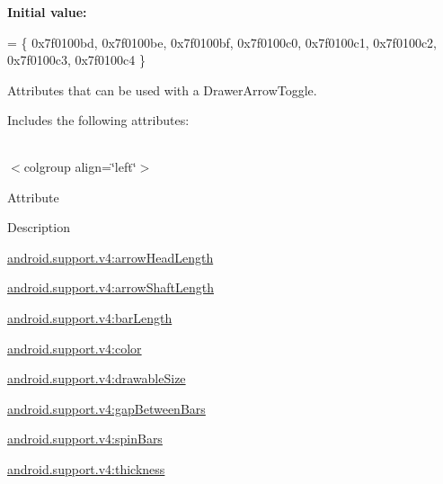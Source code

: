 {\bfseries Initial value\+:}
\begin{DoxyCode}
= \{
            0x7f0100bd, 0x7f0100be, 0x7f0100bf, 0x7f0100c0,
            0x7f0100c1, 0x7f0100c2, 0x7f0100c3, 0x7f0100c4
        \}
\end{DoxyCode}
Attributes that can be used with a Drawer\+Arrow\+Toggle. 

Includes the following attributes\+:

\tabulinesep=1mm
\begin{longtabu} spread 0pt [c]{*{0}{|X[-1]}|}
\hline
\end{longtabu}
$<$colgroup align=\char`\"{}left\char`\"{}$>$ 

Attribute

Description 

{\ttfamily \hyperlink{classandroid_1_1support_1_1v4_1_1R_1_1styleable_a23a9c7acda0be283d52e3f0e07fb0a97}{android.\+support.\+v4\+:arrow\+Head\+Length}}

{\ttfamily \hyperlink{classandroid_1_1support_1_1v4_1_1R_1_1styleable_ab53d0e29cd65acb145c6d9782b331b94}{android.\+support.\+v4\+:arrow\+Shaft\+Length}}

{\ttfamily \hyperlink{classandroid_1_1support_1_1v4_1_1R_1_1styleable_a4f8d98b05b91ea2e7981c8af25395159}{android.\+support.\+v4\+:bar\+Length}}

{\ttfamily \hyperlink{classandroid_1_1support_1_1v4_1_1R_1_1styleable_ace7c2b30ab349131726e0b7a4ea67103}{android.\+support.\+v4\+:color}}

{\ttfamily \hyperlink{classandroid_1_1support_1_1v4_1_1R_1_1styleable_a4c53abe96194151c3a62076cc72f6048}{android.\+support.\+v4\+:drawable\+Size}}

{\ttfamily \hyperlink{classandroid_1_1support_1_1v4_1_1R_1_1styleable_ae17bd4d67410b191b674e1359e019598}{android.\+support.\+v4\+:gap\+Between\+Bars}}

{\ttfamily \hyperlink{classandroid_1_1support_1_1v4_1_1R_1_1styleable_a59eac02900e4f8c75b5cef8e7f80ef10}{android.\+support.\+v4\+:spin\+Bars}}

{\ttfamily \hyperlink{classandroid_1_1support_1_1v4_1_1R_1_1styleable_a1be933a91500d201cebc19118e4160bf}{android.\+support.\+v4\+:thickness}}

